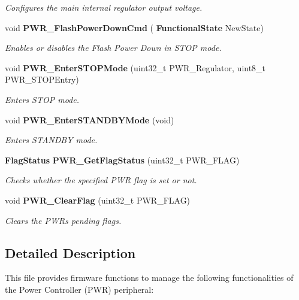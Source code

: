 \begin{DoxyCompactItemize}
\begin{DoxyCompactList}\small\item\em Configures the main internal regulator output voltage. \end{DoxyCompactList}\item 
void \textbf{ P\+W\+R\+\_\+\+Flash\+Power\+Down\+Cmd} (\textbf{ Functional\+State} New\+State)
\begin{DoxyCompactList}\small\item\em Enables or disables the Flash Power Down in S\+T\+OP mode. \end{DoxyCompactList}\item 
void \textbf{ P\+W\+R\+\_\+\+Enter\+S\+T\+O\+P\+Mode} (uint32\+\_\+t P\+W\+R\+\_\+\+Regulator, uint8\+\_\+t P\+W\+R\+\_\+\+S\+T\+O\+P\+Entry)
\begin{DoxyCompactList}\small\item\em Enters S\+T\+OP mode. \end{DoxyCompactList}\item 
void \textbf{ P\+W\+R\+\_\+\+Enter\+S\+T\+A\+N\+D\+B\+Y\+Mode} (void)
\begin{DoxyCompactList}\small\item\em Enters S\+T\+A\+N\+D\+BY mode. \end{DoxyCompactList}\item 
\textbf{ Flag\+Status} \textbf{ P\+W\+R\+\_\+\+Get\+Flag\+Status} (uint32\+\_\+t P\+W\+R\+\_\+\+F\+L\+AG)
\begin{DoxyCompactList}\small\item\em Checks whether the specified P\+WR flag is set or not. \end{DoxyCompactList}\item 
void \textbf{ P\+W\+R\+\_\+\+Clear\+Flag} (uint32\+\_\+t P\+W\+R\+\_\+\+F\+L\+AG)
\begin{DoxyCompactList}\small\item\em Clears the P\+WR\textquotesingle{}s pending flags. \end{DoxyCompactList}\end{DoxyCompactItemize}


\subsection{Detailed Description}
This file provides firmware functions to manage the following functionalities of the Power Controller (P\+WR) peripheral\+: 

